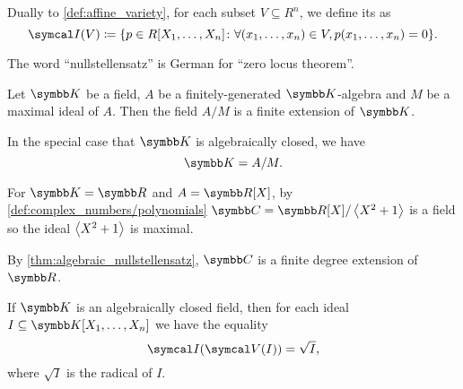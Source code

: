 \begin{definition}\label{def:ideal_of_affine_variety}\cite[70]{Коцев2016}
  Dually to \cref{def:affine_variety}, for each subset \( V \subseteq R^n \), we define its  as
  \begin{equation*}
    \Cal{I}(V) \coloneqq \{ p \in R[X_1, \ldots, X_n] \colon \forall (x_1, \ldots, x_n) \in V, p(x_1, \ldots, x_n) = 0 \}.
  \end{equation*}
\end{definition}

\begin{remark}\label{remark:nullstelletsatz_etymology}
  The word \enquote{nullstellensatz} is German for \enquote{zero locus theorem}.
\end{remark}

\begin{theorem}\label{thm:algebraic_nullstellensatz}\cite[64]{Коцев2016}
  Let \( \K \) be a field, \( A \) be a finitely-generated \( \K \)-algebra and \( M \) be a maximal ideal of \( A \). Then the field \( A / M \) is a finite extension of \( \K \).

  In the special case that \( \K \) is algebraically closed, we have
  \begin{equation*}
    \K = A / M.
  \end{equation*}
\end{theorem}

\begin{example}\label{ex:algebraic_nullstellensatz_real_over_complex}
  For \( \K = \R \) and \( A = \R[X] \), by \cref{def:complex_numbers/polynomials} \( \C = \R[X] / \Gen{X^2 + 1} \) is a field so the ideal \( \left\langle X^2 + 1 \right\rangle \) is maximal.

  By \cref{thm:algebraic_nullstellensatz}, \( \C \) is a finite degree extension of \( \R \).
\end{example}

\begin{theorem}\label{thm:geometric_nullstellensatz}\cite[70]{Коцев2016}
  If \( \K \) is an algebraically closed field, then for each ideal \( I \subseteq \K[X_1, \ldots, X_n] \) we have the equality
  \begin{equation*}
    \Cal{I}(\Cal{V}(I)) = \sqrt I,
  \end{equation*}
  where \( \sqrt I \) is the radical of \( I \).
\end{theorem}

